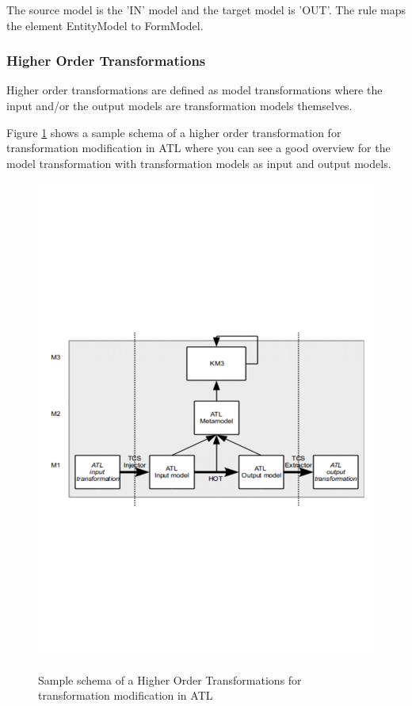 \documentclass{llncs}
\begin{document}
The source model is the 'IN' model and the target model is 'OUT'. The rule maps the element EntityModel to FormModel.

\subsubsection{Higher Order Transformations}

Higher order transformations are defined as model transformations where the input and/or the output models are transformation models themselves.\cite{Tisi:2009}

Figure \ref{fig:samplefigure_pdf} shows a sample schema of a higher order transformation for transformation modification
in ATL where you can see a good overview for the model transformation with transformation models as input and output models.

 \begin{figure}
	\centering
	\includegraphics[width=1\textwidth,natwidth=610,natheight=642]{figures/HOT.pdf}
	\caption{Sample schema of a Higher Order Transformations for transformation modification in
	ATL}\cite{misc:ModelingLanguages}
	\label{fig:samplefigure_pdf}
\end{figure}~\cite{misc:ModelingLanguages}
\end{document}

